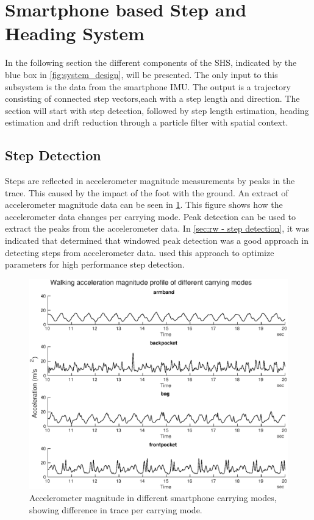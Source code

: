 \section{Smartphone based Step and Heading System}
\label{sec:method-SHS}
In the following section the different components of the \ac{SHS}, indicated by the blue box in \cref{fig:system_design}, will be presented. The only input to this subsystem is the data from the smartphone IMU. The output is a trajectory consisting of connected step vectors,each with a step length and direction. The section will start with step detection, followed by step length estimation, heading estimation and drift reduction through a particle filter with spatial context.

\subsection{Step Detection}
\label{sec:meth - step detection}

Steps are reflected in accelerometer magnitude measurements by peaks in the trace. This caused by the impact of the foot with the ground. An extract of accelerometer magnitude data can be seen in \cref{fig:accelerometer_in_different_carrying_modes}. This figure shows how the accelerometer data changes per carrying mode. Peak detection can be used to extract the peaks from the accelerometer data. In \cref{sec:rw - step detection}, it was indicated that \citet{Brajdic2013} determined that windowed peak detection was a good approach in detecting steps from accelerometer data. \citet{Salvi2018} used this approach to optimize parameters for high performance step detection.

\begin{figure}[h]
	\centering
	\includegraphics[width=0.8\linewidth]{images/20201127_1110__frontpocket_}
	\caption{Accelerometer magnitude in different smartphone carrying modes, showing difference in trace per carrying mode.}
	\label{fig:accelerometer_in_different_carrying_modes}
\end{figure}
 

